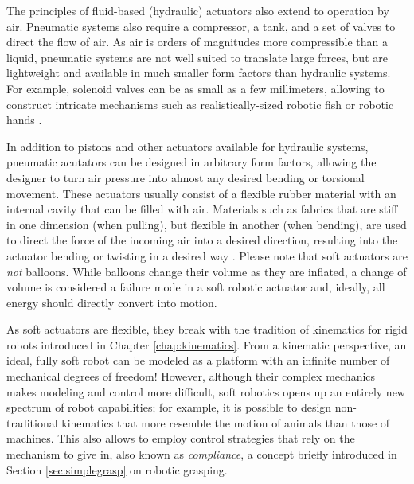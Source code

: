 The principles of fluid-based (hydraulic) actuators also extend to operation by air. Pneumatic systems also require a compressor, a tank, and a set of valves to direct the flow of air. As air is orders of magnitudes more compressible than a liquid, pneumatic systems are not well suited to translate large forces, but are lightweight and available in much smaller form factors than hydraulic systems. For example, solenoid valves can be as small as a few millimeters, allowing to construct intricate mechanisms such as realistically-sized robotic fish \cite{katzschmann2018exploration} or robotic hands \cite{deimel2016novel}.

In addition to pistons and other actuators available for hydraulic systems, pneumatic acutators can be designed in arbitrary form factors, allowing the designer to turn air pressure into almost any desired bending or torsional movement. These actuators usually consist of a flexible rubber material with an internal cavity that can be filled with air. Materials such as fabrics that are stiff in one dimension (when pulling), but flexible in another (when bending), are used to direct the force of the incoming air into a desired direction, resulting into the actuator bending or twisting in a desired way \cite{polygerinos2017soft}. Please note that soft actuators are \textsl{not} balloons. While balloons change their volume as they are inflated, a change of volume is considered a failure mode in a soft robotic actuator and, ideally, all energy should directly convert into motion.

As soft actuators are flexible, they break with the tradition of kinematics for rigid robots introduced in Chapter \ref{chap:kinematics}. From a kinematic perspective, an ideal, fully soft robot can be modeled as a platform with an infinite number of mechanical degrees of freedom!
However, although their complex mechanics makes modeling and control more difficult, soft robotics opens up an entirely new spectrum of robot capabilities; for example, it is possible to design non-traditional kinematics that more resemble the motion of animals than those of machines. This also allows to employ control strategies that rely on the mechanism to give in, also known as \textsl{compliance}, a concept briefly introduced in Section \ref{sec:simplegrasp} on robotic grasping.


